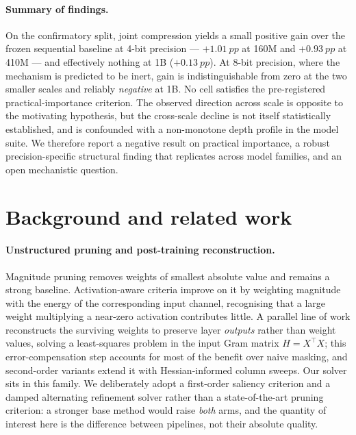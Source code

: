 \paragraph{Summary of findings.} On the confirmatory split, joint compression yields a small
positive gain over the frozen sequential baseline at 4-bit precision --- $+\SI{1.01}{pp}$ at
160M and $+\SI{0.93}{pp}$ at 410M --- and effectively nothing at 1B ($+\SI{0.13}{pp}$). At
8-bit precision, where the mechanism is predicted to be inert, gain is indistinguishable from
zero at the two smaller scales and reliably \emph{negative} at 1B. No cell satisfies the
pre-registered practical-importance criterion. The observed direction across scale is
opposite to the motivating hypothesis, but the cross-scale decline is not itself
statistically established, and is confounded with a non-monotone depth profile in the model
suite. We therefore report a negative result on practical importance, a robust
precision-specific structural finding that replicates across model families, and an open
mechanistic question.

\section{Background and related work}
\label{sec:related}

\paragraph{Unstructured pruning and post-training reconstruction.} Magnitude pruning removes
weights of smallest absolute value and remains a strong baseline. Activation-aware criteria
improve on it by weighting magnitude with the energy of the corresponding input channel,
recognising that a large weight multiplying a near-zero activation contributes little. A
parallel line of work reconstructs the surviving weights to preserve layer \emph{outputs}
rather than weight values, solving a least-squares problem in the input Gram matrix
$H = X^{\top}X$; this error-compensation step accounts for most of the benefit over naive
masking, and second-order variants extend it with Hessian-informed column sweeps. Our
solver sits in this family. We deliberately adopt a first-order saliency criterion and a
damped alternating refinement solver rather than a state-of-the-art pruning criterion: a
stronger base method would raise \emph{both} arms, and the quantity of interest here is the
difference between pipelines, not their absolute quality.

